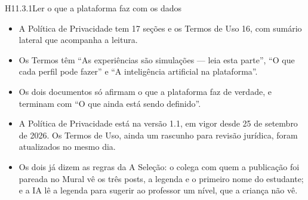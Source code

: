 \begin{historia}{H11.3.1}{Ler o que a plataforma faz com os dados}{\parcial}
\aceite
\begin{itemize}
  \item A Política de Privacidade tem 17 seções e os Termos de Uso 16, com
    sumário lateral que acompanha a leitura.
  \item Os Termos têm \enquote{As experiências são simulações --- leia esta
    parte}, \enquote{O que cada perfil pode fazer} e \enquote{A inteligência
    artificial na plataforma}.
  \item Os dois documentos só afirmam o que a plataforma faz de verdade, e
    terminam com \enquote{O que ainda está sendo definido}.
  \item A Política de Privacidade está na versão 1.1, em vigor desde 25 de
    setembro de 2026. Os Termos de Uso, ainda um rascunho para revisão
    jurídica, foram atualizados no mesmo dia.
  \item Os dois já dizem as regras da A Seleção: o colega com quem a
    publicação foi pareada no Mural vê os três posts, a legenda e o primeiro
    nome do estudante; e a IA lê a legenda para sugerir ao professor um nível,
    que a criança não vê.
\end{itemize}
\end{historia}
